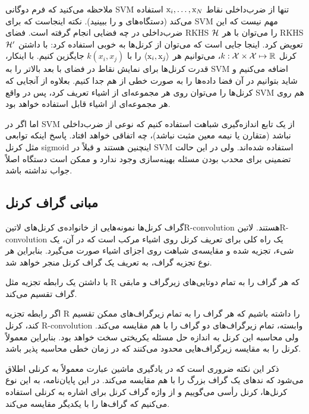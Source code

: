 ملاحظه می‌کنید که فرم دوگانی SVM تنها از ضرب‌داخلی نقاط $\mathrm{x}_i,\ldots,\mathrm{x}_N$ استفاده می‌کند (دستگاه‌های  و  را ببینید). نکته اینجاست که برای SVM مهم نیست که این ضرب‌داخلی در چه فضایی انجام گرفته است. فضای RKHS $\mathcal{H}$ را می‌توان با هر RKHS $\mathcal{H}^\prime$ تعویض کرد. اینجا جایی است که می‌توان از کرنل‌ها به خوبی استفاده کرد: با داشتن کرنل $k: \mathcal{X}\times \mathcal{X} \mapsto \mathbb{R}$، می‌توانیم هر $\langle \mathrm{x}_i,\mathrm{x}_j \rangle$ را با $k(x_i,x_j)$ جایگزین کنیم. با اینکار، قدرت کرنل‌ها برای نمایش نقاط در فضای با بعد بالاتر را به SVM اضافه می‌کنیم و شاید بتوانیم در آن فضا داده‌ها را به صورت خطی از هم جدا کنیم. بعلاوه از آنجایی که کرنل‌ها را می‌توان روی هر مجموعه‌ای از اشیاء تعریف کرد، پس در واقع SVM هم روی هر مجموعه‌ای از اشیاء قابل استفاده خواهد بود.

اما اگر در SVM از یک تابع اندازه‌گیری شباهت استفاده کنیم که نوعی از ضرب‌داخلی نباشد (متقارن یا نیمه معین مثبت نباشد)، چه اتفاقی خواهد افتاد. پاسخ اینکه توابعی مثل کرنل sigmoid اینچنین هستند و قبلاً در SVM استفاده شده‌اند. ولی در این حالت تضمینی برای محدب بودن مسئله بهینه‌سازی وجود ندارد و ممکن است دستگاه  اصلاً جواب نداشته باشد.

\subsection{مبانی گراف کرنل‌}\label{sec:graph-kernel-basics}
گراف کرنل‌ها نمونه‌هایی از خانواده‌ی کرنل‌های ‌لاتین{R-convolution} هستند. ‌لاتین{R-convolution} یک راه کلی برای تعریف کرنل روی اشیاء مرکب است که در آن، یک شیء، تجزیه شده و مقایسه‌ی شباهت روی اجزای اشیاء صورت می‌گیرد. بنابراین هر نوع تجزیه گراف، به تعریف یک گراف کرنل منجر خواهد شد.

با داشتن یک رابطه تجزیه مثل R که هر گراف را به تمام دوتایی‌های زیرگراف و مابقی گراف تقسیم می‌کند.

اگر رابطه تجزیه R را داشته باشیم که هر گراف را به تمام زیرگراف‌های ممکن تقسیم کند، کرنل R-convolution وابسته، تمام زیرگراف‌های دو گراف را با هم مقایسه می‌کند. ولی محاسبه این کرنل به اندازه حل مسئله یکریختی سخت خواهد بود. بنابراین معمولاً کرنل را به مقایسه زیرگراف‌هایی محدود می‌کنند که در زمان خطی محاسبه پذیر باشد.

ذکر این نکته ضروری است که در یادگیری ماشین عبارت  معمولاً به کرنلی اطلاق می‌شود که ند‌های یک گراف بزرگ را با هم مقایسه می‌کند. در این پایان‌نامه، به این نوع کرنل‌ها، کرنل رأسی می‌گوییم و از واژه گراف کرنل برای اشاره به کرنلی استفاده می‌کنیم که گراف‌ها را با یکدیگر مقایسه می‌کند.

